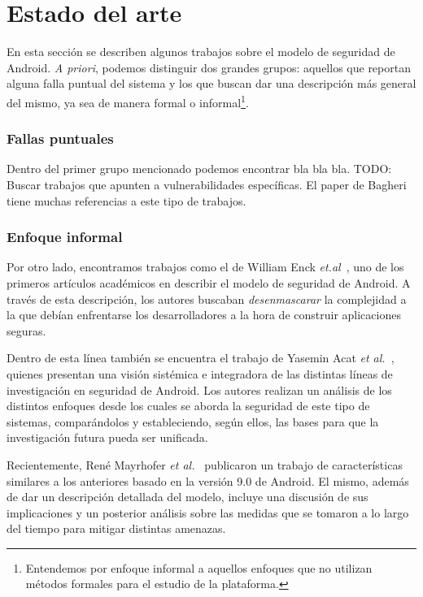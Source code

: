
\chapter*{Estado del arte}
\label{chapter:estado}

En esta sección se describen algunos trabajos sobre el modelo de seguridad de
Android. \textit{A priori}, podemos distinguir dos grandes grupos: aquellos que
reportan alguna falla puntual del sistema y los que buscan dar una descripción
más general del mismo, ya sea de manera formal o informal\footnote{Entendemos
por enfoque informal a aquellos enfoques que no utilizan métodos formales para
el estudio de la plataforma.}.

\subsection*{Fallas puntuales}

Dentro del primer grupo mencionado podemos encontrar bla bla bla. TODO: Buscar
trabajos que apunten a vulnerabilidades específicas. El paper de Bagheri
\cite{bagheri} tiene muchas referencias a este tipo de trabajos.

\subsection*{Enfoque informal}

Por otro lado, encontramos trabajos como el de William Enck
\textit{et.al}~\cite{enck}, uno de los primeros artículos académicos en
describir el modelo de seguridad de Android. A través de esta descripción, los
autores buscaban \textit{desenmascarar} la complejidad a la que debían
enfrentarse
%
%
los desarrolladores a la hora de construir aplicaciones seguras.

Dentro de esta línea también se encuentra el trabajo de Yasemin Acat \textit{et
al.}~\cite{sok}, quienes presentan una visión sistémica e integradora de las
distintas líneas de investigación en seguridad de Android. Los autores realizan
un análisis de los distintos enfoques desde los cuales se aborda la seguridad de
este tipo de sistemas, comparándolos y estableciendo, según ellos, las bases para
que la investigación futura pueda ser unificada.

Recientemente, René Mayrhofer \textit{et al.}~\cite{mayrhofer} publicaron un
trabajo de características similares a los anteriores basado en la versión 9.0
de Android. El mismo, además de dar un descripción detallada del modelo, incluye
una discusión de sus implicaciones y un posterior análisis sobre las medidas que
se tomaron a lo largo del tiempo para mitigar distintas amenazas.

